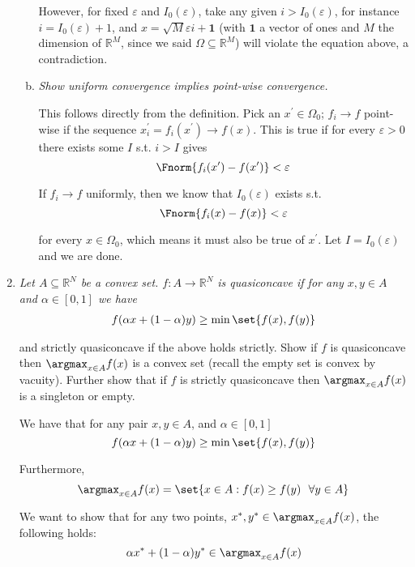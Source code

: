 \documentclass{article}
\begin{document}
\begin{enumerate}[1.]
\begin{enumerate}[a)]
        However, for fixed $\varepsilon$ and $I_0(\varepsilon)$, take any given $i > I_0(\varepsilon)$, for instance $i = I_0(\varepsilon) + 1$, and $x = \sqrt{M} \varepsilon i + \mathbf{1}$ (with $\mathbf{1}$ a vector of ones and $M$ the dimension of $\mathbb{R}^M$, since we said $\Omega \subseteq \mathbb{R}^M$) will violate the equation above, a contradiction.

      \item \textit{Show uniform convergence implies point-wise convergence.}

        \solution This follows directly from the definition. Pick an $x^\prime \in \Omega_0$; $f_i \to f$ point-wise if the sequence $x^\prime_i = f_i(x^\prime) \to f(x)$. This is true if for every $\varepsilon > 0$ there exists some $I$ s.t. $i > I$ gives
        \[
          \Fnorm{f_i(x^\prime) - f(x^\prime)} < \varepsilon
        \]

        If $f_i \to f$ uniformly, then we know that $I_0(\varepsilon)$ exists s.t.
        \[
          \Fnorm{f_i(x) - f(x)} < \varepsilon
        \]

        for every $x \in \Omega_0$, which means it must also be true of $x^\prime$. Let $I = I_0(\varepsilon)$ and we are done.
    \end{enumerate}

  \item {\itshape Let $A \subseteq \mathbb{R}^N$ be a convex set. $f: A \to \mathbb{R}^N$ is quasiconcave if for any $x, y \in A$ and $\alpha \in [0, 1]$ we have
      \begin{align*}
        f(\alpha x + (1 - \alpha) y) \ge \min\set{f(x), f(y)}
      \end{align*}

    and strictly quasiconcave if the above holds strictly. Show if $f$ is quasiconcave then $\argmax_{x \in A} f(x)$ is a convex set (recall the empty set is convex by vacuity). Further show that if $f$ is strictly quasiconcave then $\argmax_{x \in A} f(x)$ is a singleton or empty.}

    \solution We have that for any pair $x, y \in A$, and $\alpha \in [0, 1]$
      \[
        f(\alpha x + (1 - \alpha) y) \ge \min\set{f(x), f(y)}
      \]

      Furthermore,
      \[
        \argmax_{x \in A} f(x) = \set{x \in A: f(x) \ge f(y) ~~ \forall y \in A}
      \]

      We want to show that for any two points, $x^*, y^* \in \argmax_{x \in A} f(x)$, the following holds:
      \[
        \alpha x^* + (1 - \alpha) y^* \in \argmax_{x \in A} f(x)
      \]


\end{enumerate}
\end{document}
